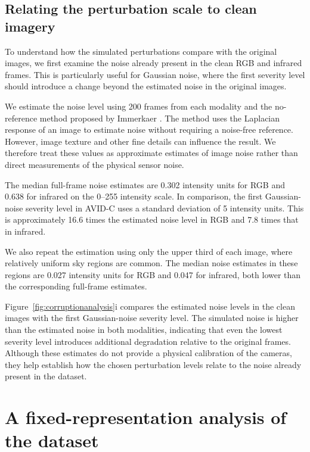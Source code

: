 \documentclass[10pt]{article}
\newcommand{\corrupt}{\textsc{AVID-C}}
\begin{document}
\subsection{Relating the perturbation scale to clean imagery}

To understand how the simulated perturbations compare with the original images, we first examine the noise already present in the clean RGB and infrared frames. This is particularly useful for Gaussian noise, where the first severity level should introduce a change beyond the estimated noise in the original images.

We estimate the noise level using 200 frames from each modality and the no-reference method proposed by Immerkaer \citep{immerkaer1996}. The method uses the Laplacian response of an image to estimate noise without requiring a noise-free reference. However, image texture and other fine details can influence the result. We therefore treat these values as approximate estimates of image noise rather than direct measurements of the physical sensor noise.

The median full-frame noise estimates are 0.302 intensity units for RGB and 0.638 for infrared on the 0--255 intensity scale. In comparison, the first Gaussian-noise severity level in \corrupt{} uses a standard deviation of 5 intensity units. This is approximately 16.6 times the estimated noise level in RGB and 7.8 times that in infrared.

We also repeat the estimation using only the upper third of each image, where relatively uniform sky regions are common. The median noise estimates in these regions are 0.027 intensity units for RGB and 0.047 for infrared, both lower than the corresponding full-frame estimates.

Figure~\ref{fig:corruptionanalysis}i compares the estimated noise levels in the clean images with the first Gaussian-noise severity level. The simulated noise is higher than the estimated noise in both modalities, indicating that even the lowest severity level introduces additional degradation relative to the original frames. Although these estimates do not provide a physical calibration of the cameras, they help establish how the chosen perturbation levels relate to the noise already present in the dataset.


\section{A fixed-representation analysis of the dataset}
\label{sec:intrinsic}
\end{document}
